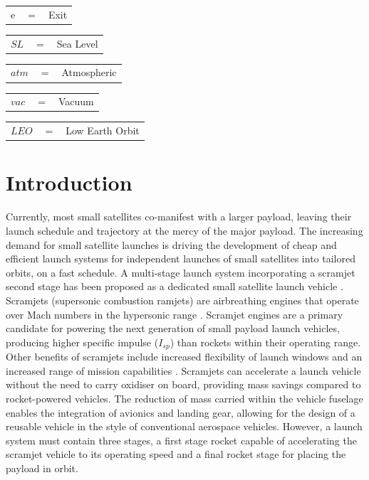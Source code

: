 \documentclass[journal]{new-aiaa}
\begin{document}
\begin{tabular}{p{1.2cm}p{1cm}p{5cm}}
	e & $=$ & Exit\\
\end{tabular} 
\begin{tabular}{p{1.2cm}p{1cm}p{5cm}}
	$SL$ & $=$ & Sea Level\\
\end{tabular} 
\begin{tabular}{p{1.2cm}p{1cm}p{5cm}}
	$atm$ & $=$ & Atmospheric\\
	
\end{tabular} 
\begin{tabular}{p{1.2cm}p{1cm}p{5cm}}
	$vac$ & $=$ & Vacuum\\
	
\end{tabular} 
\begin{tabular}{p{1.2cm}p{1cm}p{5cm}}
	$LEO$ & $=$ & Low Earth Orbit\\
	
\end{tabular} 
\newpage
\section{Introduction}






Currently, most small satellites co-manifest with a larger payload, leaving their launch schedule and trajectory at the mercy of the major payload. The  increasing demand for small satellite launches\cite{Faa&Ast&Comstac2015} is driving the development of cheap and efficient launch systems for independent launches of small satellites into tailored orbits, on a fast schedule. 
A multi-stage launch system incorporating a scramjet second stage has been proposed as a dedicated small satellite launch vehicle \cite{Smart2009a}. 
Scramjets (supersonic combustion ramjets) are airbreathing engines that operate over Mach numbers in the hypersonic  range \cite{HeiserWilliamPratt1994}. 
Scramjet engines are a primary candidate for powering the next generation of small payload launch vehicles, producing higher specific impulse ($I_{sp}$)  than rockets within their operating range. Other benefits of scramjets include increased flexibility of launch windows and an increased range of mission capabilities \cite{Flaherty2010}. 
Scramjets can accelerate a launch vehicle without the need to carry oxidiser on board, providing mass savings compared to rocket-powered vehicles. 
 The reduction of mass carried within the vehicle fuselage enables the integration of avionics and landing gear, allowing for the design of a reusable vehicle in the style of conventional aerospace vehicles. 
However, a launch system must contain three stages, a first stage rocket capable of accelerating the scramjet vehicle to its operating speed and a final rocket stage for placing the payload in orbit. 
\end{document}
